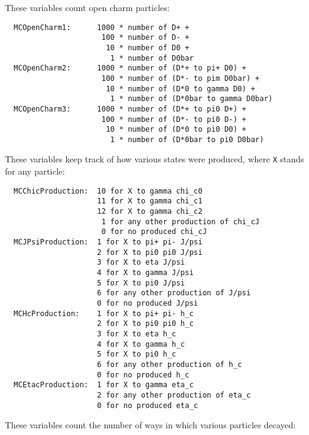 \documentclass[11pt,a4paper]{define/cepcnote}
\begin{document}
These variables count open charm particles:

\begin{verbatim}
  MCOpenCharm1:      1000 * number of D+ +
                      100 * number of D- +
                       10 * number of D0 +
                        1 * number of D0bar
  MCOpenCharm2:      1000 * number of (D*+ to pi+ D0) +
                      100 * number of (D*- to pim D0bar) +
                       10 * number of (D*0 to gamma D0) +
                        1 * number of (D*0bar to gamma D0bar)
  MCOpenCharm3:      1000 * number of (D*+ to pi0 D+) +
                      100 * number of (D*- to pi0 D-) +
                       10 * number of (D*0 to pi0 D0) +
                        1 * number of (D*0bar to pi0 D0bar)
\end{verbatim}

These variables keep track of how various states were produced, where {\tt X} stands for any particle:

\begin{verbatim}
  MCChicProduction:  10 for X to gamma chi_c0
                     11 for X to gamma chi_c1
                     12 for X to gamma chi_c2
                      1 for any other production of chi_cJ
                      0 for no produced chi_cJ
  MCJPsiProduction:  1 for X to pi+ pi- J/psi
                     2 for X to pi0 pi0 J/psi
                     3 for X to eta J/psi
                     4 for X to gamma J/psi
                     5 for X to pi0 J/psi
                     6 for any other production of J/psi
                     0 for no produced J/psi
  MCHcProduction:    1 for X to pi+ pi- h_c
                     2 for X to pi0 pi0 h_c
                     3 for X to eta h_c
                     4 for X to gamma h_c
                     5 for X to pi0 h_c
                     6 for any other production of h_c
                     0 for no produced h_c
  MCEtacProduction:  1 for X to gamma eta_c
                     2 for any other production of eta_c
                     0 for no produced eta_c
\end{verbatim}

These variables count the number of ways in which various particles decayed:
\end{document}
